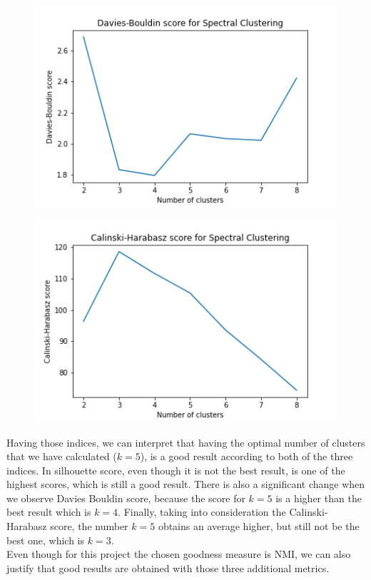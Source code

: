 \documentclass[12pt]{article}
\begin{document}
\begin{figure}[h]
    \centering
    \includegraphics[scale=0.4]{best-db.png}
\end{figure}

\begin{figure}[H]
    \centering
    \includegraphics[scale=0.4]{best-ch.png}
\end{figure}

Having those indices, we can interpret that having the optimal number of clusters that we have calculated ($k=5$), is a good result according to both of the three indices. In silhouette score, even though it is not the best result, is one of the highest scores, which is still a good result. There is also a significant change when we observe Davies Bouldin score, because the score for $k=5$ is a higher than the best result which is $k=4$. Finally, taking into consideration the Calinski-Harabasz score, the number $k=5$ obtains an average higher, but still not be the best one, which is $k=3$.\\

Even though for this project the chosen goodness measure is NMI, we can also justify that good results are obtained with those three additional metrics.
\end{document}
